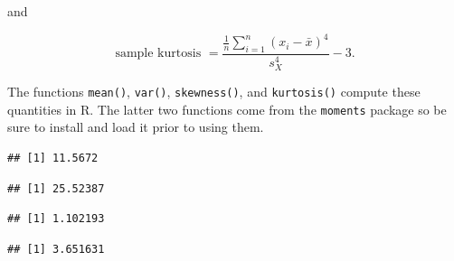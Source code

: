 \documentclass[
]{book}
\newenvironment{Shaded}{\begin{snugshade}}{\end{snugshade}}
\newcommand{\DocumentationTok}[1]{\textcolor[rgb]{0.56,0.35,0.01}{\textbf{\textit{#1}}}}
\newcommand{\FunctionTok}[1]{\textcolor[rgb]{0.13,0.29,0.53}{\textbf{#1}}}
\newcommand{\NormalTok}[1]{#1}
\newcommand{\SpecialCharTok}[1]{\textcolor[rgb]{0.81,0.36,0.00}{\textbf{#1}}}
\begin{document}
and

\begin{equation} 
\text{sample kurtosis } =  \frac{\frac{1}{n} \sum_{i=1}^n (x_i - \bar{x})^4}{s_X^4} - 3.
\label{eq:4-sampkurt}
\end{equation}

The functions \texttt{mean()}, \texttt{var()}, \texttt{skewness()}, and \texttt{kurtosis()} compute these quantities in R. The latter two functions come from the \texttt{moments} package so be sure to install and load it prior to using them.

\begin{Shaded}
\end{Shaded}

\begin{verbatim}
## [1] 11.5672
\end{verbatim}

\begin{Shaded}
\end{Shaded}

\begin{verbatim}
## [1] 25.52387
\end{verbatim}

\begin{Shaded}
\end{Shaded}

\begin{verbatim}
## [1] 1.102193
\end{verbatim}

\begin{Shaded}
\end{Shaded}

\begin{verbatim}
## [1] 3.651631
\end{verbatim}

  
\end{document}
